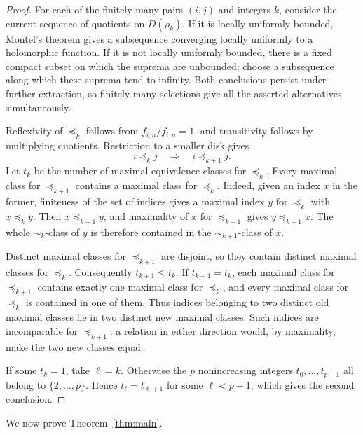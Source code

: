 \documentclass[12pt,letterpaper,reqno]{amsart}
\theoremstyle{definition}
\numberwithin{equation}{section}
\begin{document}
\begin{proof}
    For each of the finitely many pairs $(i,j)$ and integers $k$,
    consider the current sequence of quotients on $D(\rho_k)$.
   If it is locally uniformly bounded, Montel's theorem
\cite[Theorem~2.9]{Con78}
gives a subsequence converging locally uniformly to a holomorphic function.
    If it is not locally uniformly bounded, there is a fixed compact
    subset on which the suprema are unbounded; choose a subsequence
    along which these suprema tend to infinity. Both conclusions
    persist under further extraction, so finitely many selections
    give all the asserted alternatives simultaneously.

    Reflexivity of $\preceq_k$ follows from $f_{i,n}/f_{i,n}=1$,
    and transitivity follows by multiplying quotients. Restriction
    to a smaller disk gives
    \[
        i\preceq_k j\quad\Longrightarrow\quad i\preceq_{k+1}j.
    \]
    Let $t_k$ be the number of maximal equivalence classes for
    $\preceq_k$. Every maximal class for $\preceq_{k+1}$ contains a
    maximal class for $\preceq_k$. Indeed, given an index $x$ in the
    former, finiteness of the set of indices gives a maximal index
    $y$ for $\preceq_k$ with $x\preceq_k y$. Then
    $x\preceq_{k+1}y$, and maximality of $x$ for $\preceq_{k+1}$
    gives $y\preceq_{k+1}x$. The whole $\sim_k$-class of $y$ is
    therefore contained in the $\sim_{k+1}$-class of $x$.

    Distinct maximal classes for $\preceq_{k+1}$ are disjoint, so
    they contain distinct maximal classes for $\preceq_k$.
    Consequently $t_{k+1}\le t_k$. If $t_{k+1}=t_k$, each maximal
    class for $\preceq_{k+1}$ contains exactly one maximal class
    for $\preceq_k$, and every maximal class for $\preceq_k$ is
    contained in one of them. Thus indices belonging to two distinct
    old maximal classes lie in two distinct new maximal classes. Such
    indices are incomparable for $\preceq_{k+1}$:
    a relation in either direction would, by maximality, make the
    two new classes equal.

    If some $t_k=1$, take $\ell=k$. Otherwise the $p$ nonincreasing
    integers $t_0,\ldots,t_{p-1}$ all belong to $\{2,\ldots,p\}$.
    Hence $t_\ell=t_{\ell+1}$ for some $\ell<p-1$, which gives
    the second conclusion.
\end{proof}

We now prove Theorem~\ref{thm:main}.
\end{document}

